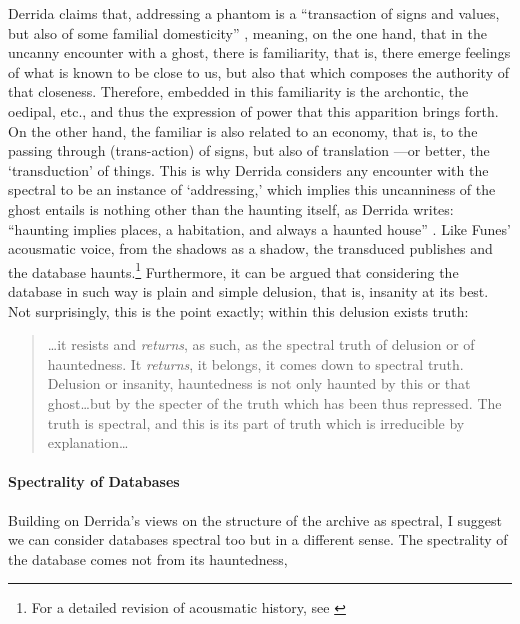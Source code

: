 Derrida claims that, addressing a phantom is a ``transaction of signs and values, but also of some familial domesticity'' \parencite[55]{Der95:Arc}, meaning, on the one hand, that in the uncanny encounter with a ghost, there is familiarity, that is, there emerge feelings of what is known to be close to us, but also that which composes the authority of that closeness. Therefore, embedded in this familiarity is the archontic, the oedipal, etc., and thus the expression of power that this apparition brings forth. On the other hand, the familiar is also related to an economy, that is, to the passing through (trans-action) of signs, but also of translation ---or better, the `transduction' of things. This is why Derrida considers any encounter with the spectral to be an instance of `addressing,' which implies this uncanniness of the ghost entails is nothing other than the haunting itself, as Derrida writes: ``haunting implies places, a habitation, and always a haunted house'' \parencite[55]{Der95:Arc}. Like Funes' acousmatic voice, from the shadows as a shadow, the transduced publishes and the database haunts.\footnote{For a detailed revision of acousmatic history, see \textcite{Kan14:Sou}} Furthermore, it can be argued that considering the database in such way is plain and simple delusion, that is, insanity at its best. Not surprisingly, this is the point exactly; within this delusion exists truth:

\begin{quote}
	\dots it resists and \textit{returns}, as such, as the spectral truth of delusion or of hauntedness. It \textit{returns}, it belongs, it comes down to spectral truth. Delusion or insanity, hauntedness is not only haunted by this or that ghost\dots but by the specter of the truth which has been thus repressed. The truth is spectral, and this is its part of truth which is irreducible by explanation\dots \parencite[54-56]{Der95:Arc}
\end{quote} %

\paragraph{Spectrality of Databases}
Building on Derrida's views on the structure of the archive as spectral, I suggest we can consider databases spectral too but in a different sense. The spectrality of the database comes not from its hauntedness,


